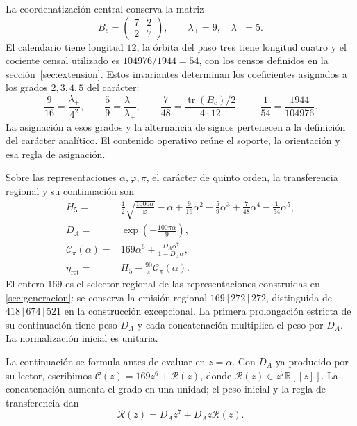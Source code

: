 La coordenatización central conserva la matriz
\[
 B_c=\begin{pmatrix}7&2\\2&7\end{pmatrix},
 \qquad\lambda_+=9,\quad\lambda_-=5.
\]
El calendario tiene longitud \(12\), la órbita del paso tres tiene
longitud cuatro y el cociente censal utilizado es
\(104976/1944=54\), con los censos definidos en la
sección~\ref{sec:extension}. Estos invariantes determinan los coeficientes
asignados a los grados \(2,3,4,5\) del carácter:
\begin{equation}
 \frac9{16}=\frac{\lambda_+}{4^2},\qquad
 \frac59=\frac{\lambda_-}{\lambda_+},\qquad
 \frac7{48}=\frac{\operatorname{tr}(B_c)/2}{4\cdot12},
 \qquad
 \frac1{54}=\frac{1944}{104976}.
 \label{iv:action:coeficientes}
\end{equation}
La asignación a esos grados y la alternancia de signos pertenecen
a la definición del carácter analítico. El contenido operativo
reúne el soporte, la orientación y esa regla de asignación.

\begin{definition}
\label{iv:action:lectores}
Sobre las representaciones \(\alpha,\varphi,\pi\), el carácter de
quinto orden, la transferencia regional y su continuación son
\begin{align}
 H_5={}&\frac12\sqrt{\frac{1000\alpha}{\varphi}}-\alpha
       +\frac9{16}\alpha^2-\frac59\alpha^3
       +\frac7{48}\alpha^4-\frac1{54}\alpha^5,
       \label{iv:action:h5}\\
 D_A={}&\exp\!\left(-\frac{100\pi\alpha}{9}\right),
       \label{iv:action:da}\\
 \mathcal C_\pi(\alpha)={}&169\alpha^6+
       \frac{D_A\alpha^7}{1-D_A\alpha},
       \label{iv:action:cpi}\\
 \eta_{\mathrm{ret}}={}&H_5-\frac{90}{\pi}\mathcal C_\pi(\alpha).
       \label{iv:action:eta-ret}
\end{align}
El entero \(169\) es el selector regional de las representaciones
construidas en \ref{sec:generacion}: se conserva la emisión regional
\(169\,|\,272\,|\,272\), distinguida de
\(418\,|\,674\,|\,521\) en la construcción excepcional.
La primera prolongación estricta de su continuación
tiene peso \(D_A\) y cada concatenación multiplica el peso por
\(D_A\). La normalización inicial es unitaria.
\end{definition}

La continuación se formula antes de evaluar en \(z=\alpha\).
Con \(D_A\) ya producido por su lector, escribimos
\(\mathscr C(z)=169z^6+\mathscr R(z)\), donde
\(\mathscr R(z)\in z^7\mathbb R[[z]]\).
La concatenación aumenta el grado en una unidad; el peso inicial
y la regla de transferencia dan
\begin{equation}
 \mathscr R(z)=D_Az^7+D_Az\mathscr R(z).
 \label{iv:action:renovacion}
\end{equation}

